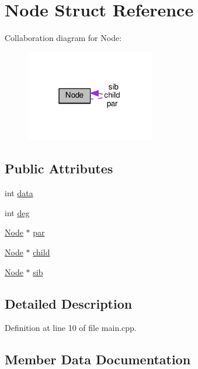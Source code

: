 \hypertarget{struct_node}{}\section{Node Struct Reference}
\label{struct_node}


Collaboration diagram for Node\+:
\nopagebreak
\begin{figure}[H]
\begin{center}
\leavevmode
\includegraphics[width=159pt]{struct_node__coll__graph}
\end{center}
\end{figure}
\subsection*{Public Attributes}
\begin{DoxyCompactItemize}
\item 
int \hyperlink{struct_node_a87c003c9f600e3fc58e6e90835f0b605}{data}
\item 
int \hyperlink{struct_node_a7e62acb60050120d8d3d5b8fb640bbcb}{deg}
\item 
\hyperlink{struct_node}{Node} $\ast$ \hyperlink{struct_node_abc9a07a65bab86d77438b34e607ba148}{par}
\item 
\hyperlink{struct_node}{Node} $\ast$ \hyperlink{struct_node_a1124b77881c051aee791e949376f82e2}{child}
\item 
\hyperlink{struct_node}{Node} $\ast$ \hyperlink{struct_node_a2df7d905421f931a2b076706e7daed1b}{sib}
\end{DoxyCompactItemize}


\subsection{Detailed Description}


Definition at line 10 of file main.\+cpp.



\subsection{Member Data Documentation}
\mbox{\label{struct_node_a1124b77881c051aee791e949376f82e2}} 
